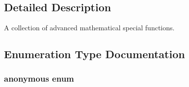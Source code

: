 \subsection{Detailed Description}
A collection of advanced mathematical special functions. 

\subsection{Enumeration Type Documentation}
\hypertarget{group__gnu__math__spec__func_gad6c62dd86a596716cece6ac2d4cfd4b3}{}\subsubsection[{anonymous enum}]{\setlength{\rightskip}{0pt plus 5cm}anonymous enum}\label{group__gnu__math__spec__func_gad6c62dd86a596716cece6ac2d4cfd4b3}
